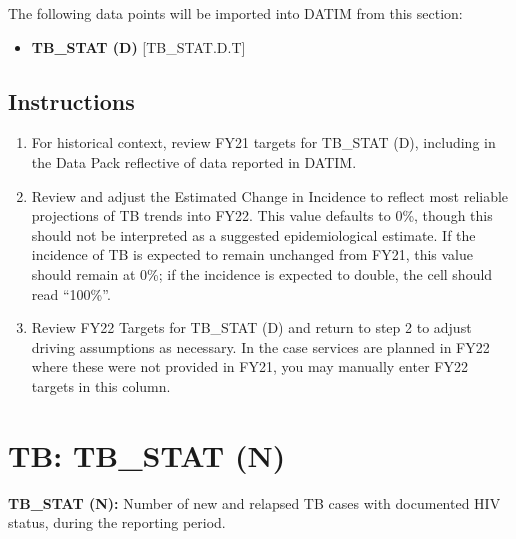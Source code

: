 \documentclass[
  openany]{book}
\providecommand{\tightlist}{%
  \setlength{\itemsep}{0pt}\setlength{\parskip}{0pt}}
\begin{document}
The following data points will be imported into DATIM from this section:

\begin{itemize}
\tightlist
\item
  \textbf{TB\_STAT (D)} {[}TB\_STAT.D.T{]}
\end{itemize}

\hypertarget{instructions-17}{%
\subsection{Instructions}\label{instructions-17}}

\begin{enumerate}
\def\labelenumi{\arabic{enumi}.}
\item
  For historical context, review FY21 targets for TB\_STAT (D),
  including in the Data Pack reflective of data reported in DATIM.
\item
  Review and adjust the Estimated Change in Incidence to reflect most
  reliable projections of TB trends into FY22. This value defaults to
  0\%, though this should not be interpreted as a suggested
  epidemiological estimate. If the incidence of TB is expected to
  remain unchanged from FY21, this value should remain at 0\%; if the
  incidence is expected to double, the cell should read ``100\%''.
\item
  Review FY22 Targets for TB\_STAT (D) and return to step 2 to adjust
  driving assumptions as necessary. In the case services are planned
  in FY22 where these were not provided in FY21, you may manually
  enter FY22 targets in this column.
\end{enumerate}

\hypertarget{tb-tb_stat-n}{%
\section{TB: TB\_STAT (N)}\label{tb-tb_stat-n}}

\textbf{TB\_STAT (N):} Number of new and relapsed TB cases with documented HIV
status, during the reporting period.
\end{document}
